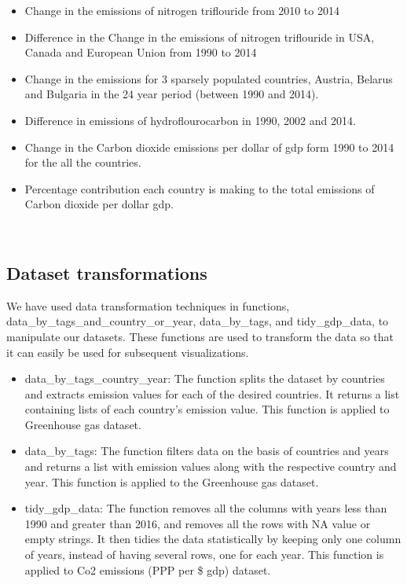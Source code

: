 \documentclass[a4paper, 11pt]{report}
\begin{document}
\begin{itemize}

\item Change in the emissions of nitrogen triflouride from 2010 to 2014

\item Difference in the Change in the emissions of nitrogen triflouride in USA, Canada and European Union from 1990 to 2014

\item Change in the emissions for 3 sparsely populated countries, Austria, Belarus and Bulgaria in the 24 year period (between 1990 and 2014).

\item Difference in emissions of hydroflourocarbon in 1990, 2002 and 2014.

\item Change in the Carbon dioxide emissions per dollar of gdp form 1990 to 2014 for the all the countries.

\item Percentage contribution each country is making to the total emissions of Carbon dioxide per dollar gdp.


\end{itemize}
~\\

\subsection{Dataset transformations}

We have used data transformation techniques in functions, data\_by\_tags\_and\_country\_or\_year, data\_by\_tags, and tidy\_gdp\_data,  to manipulate our datasets. These functions are used to transform the data so that it can easily be used for subsequent visualizations.

\begin{itemize}
    \item data\_by\_tags\_country\_year: The function splits the dataset by countries and extracts emission values for each of the desired countries. It returns a list containing lists of each country’s emission value. This function is applied to Greenhouse gas dataset.

    \item data\_by\_tags: The function filters data on the basis of countries and years and returns a list with emission values along with the respective country and year. This function is applied to the Greenhouse gas dataset.

    \item tidy\_gdp\_data: The function removes all the columns with years less than 1990 and greater than 2016, and removes all the rows with NA value or empty strings. It then tidies the data statistically by keeping only one column of years, instead of having several rows, one for each year. This function is applied to Co2 emissions (PPP per \$ gdp) dataset.\\
\end{itemize}
\newpage
\end{document}
